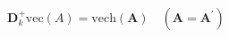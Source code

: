 \begin{equation}
    \mathbf{D}_{k}^{+}
    \mathrm{vec}
    \left(
    A
    \right)
    =
    \mathrm{vech}
    \left(
    \mathbf{A}
    \right)
    \quad
    \left(
    \mathbf{A} = \mathbf{A}^{\prime}
    \right)
    \label{eq:linearAlgebra-pinv-of-dcap-2}
\end{equation}
